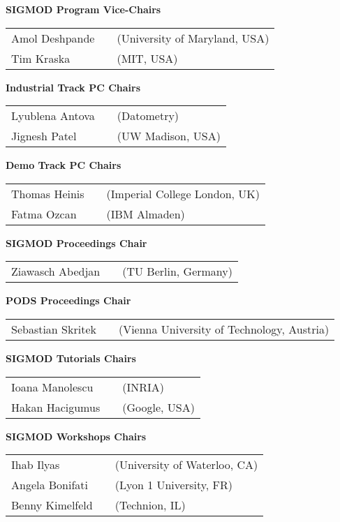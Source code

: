 {\vfill
\textbf{SIGMOD Program Vice-Chairs}

\begin{tabular}{lp{.5em}l}
Amol Deshpande	&& \textsf{\footnotesize(University of Maryland, USA)}	\\
Tim Kraska	&& \textsf{\footnotesize(MIT, USA)}
\end{tabular}

\vfill
\textbf{Industrial Track PC Chairs}

\begin{tabular}{lp{.5em}l}
Lyublena Antova	&& \textsf{\footnotesize(Datometry)}	\\
Jignesh Patel	&& \textsf{\footnotesize(UW Madison, USA)}
\end{tabular}

\vfill
\textbf{Demo Track PC Chairs}

\begin{tabular}{lp{.5em}l}
Thomas Heinis	&& \textsf{\footnotesize(Imperial College London, UK)}	\\
Fatma Ozcan	&& \textsf{\footnotesize(IBM Almaden)}
\end{tabular}

\vfill
\textbf{SIGMOD Proceedings Chair}

\begin{tabular}{lp{.5em}l}
Ziawasch Abedjan	&& \textsf{\footnotesize(TU Berlin, Germany)}
\end{tabular}

\vfill
\textbf{PODS Proceedings Chair}

\begin{tabular}{lp{.5em}l}
Sebastian Skritek	&& \textsf{\footnotesize(Vienna University of Technology, Austria)}
\end{tabular}

\vfill
\textbf{SIGMOD Tutorials Chairs}

\begin{tabular}{lp{.5em}l}
Ioana Manolescu	&& \textsf{\footnotesize(INRIA)}	\\
Hakan Hacigumus	&& \textsf{\footnotesize(Google, USA)}
\end{tabular}

\vfill
\textbf{SIGMOD Workshops Chairs}

\begin{tabular}{lp{.5em}l}
Ihab Ilyas	&& \textsf{\footnotesize(University of Waterloo, CA)}	\\
Angela Bonifati	&& \textsf{\footnotesize(Lyon 1 University, FR)}	\\
Benny Kimelfeld	&& \textsf{\footnotesize(Technion, IL)}
\end{tabular}

}
